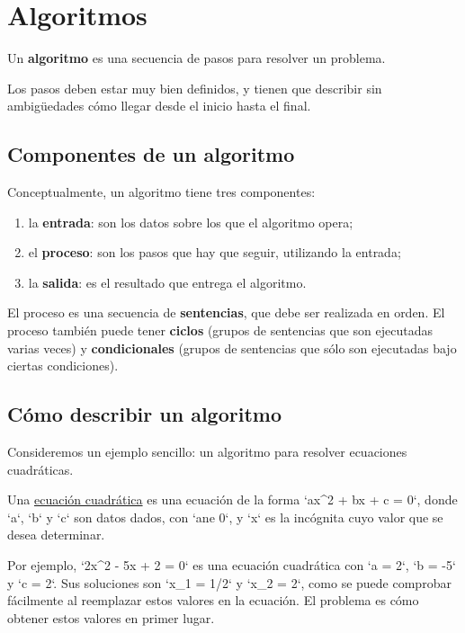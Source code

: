 \section{Algoritmos}

Un \textbf{algoritmo} es una secuencia de pasos para resolver un
problema.

Los pasos deben estar muy bien definidos, y tienen que describir sin
ambigüedades cómo llegar desde el inicio hasta el final.

\subsection{Componentes de un algoritmo}

Conceptualmente, un algoritmo tiene tres componentes:

\begin{enumerate}[1.]
\item
  la \textbf{entrada}: son los datos sobre los que el algoritmo opera;
\item
  el \textbf{proceso}: son los pasos que hay que seguir, utilizando la
  entrada;
\item
  la \textbf{salida}: es el resultado que entrega el algoritmo.
\end{enumerate}

El proceso es una secuencia de \textbf{sentencias}, que debe ser
realizada en orden. El proceso también puede tener \textbf{ciclos}
(grupos de sentencias que son ejecutadas varias veces) y
\textbf{condicionales} (grupos de sentencias que sólo son ejecutadas
bajo ciertas condiciones).

\subsection{Cómo describir un algoritmo}

Consideremos un ejemplo sencillo: un algoritmo para resolver ecuaciones
cuadráticas.

Una
\href{http://es.wikipedia.org/wiki/Ecuaci\%C3\%B3n\_de\_segundo\_grado}{ecuación
cuadrática} es una ecuación de la forma `ax\^{}2 + bx + c = 0`, donde
`a`, `b` y `c` son datos dados, con `ane 0`, y `x` es la incógnita cuyo
valor que se desea determinar.

Por ejemplo, `2x\^{}2 - 5x + 2 = 0` es una ecuación cuadrática con `a =
2`, `b = -5` y `c = 2`. Sus soluciones son `x\_1 = 1/2` y `x\_2 = 2`,
como se puede comprobar fácilmente al reemplazar estos valores en la
ecuación. El problema es cómo obtener estos valores en primer lugar.

